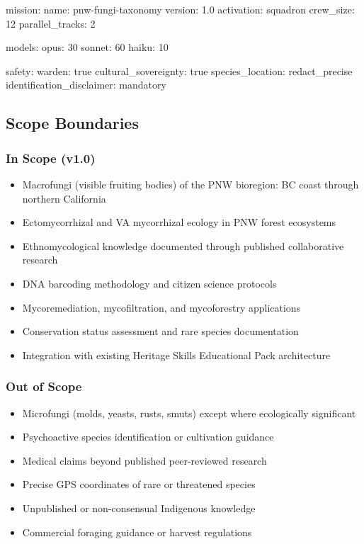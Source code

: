 \documentclass[11pt,letterpaper]{article}
\begin{document}
\begin{asciibox}
mission:
  name: pnw-fungi-taxonomy
  version: 1.0
  activation: squadron
  crew_size: 12
  parallel_tracks: 2

models:
  opus: 30%
  sonnet: 60%
  haiku: 10%

safety:
  warden: true
  cultural_sovereignty: true
  species_location: redact_precise
  identification_disclaimer: mandatory
\end{asciibox}

\subsection{Scope Boundaries}

\subsubsection{In Scope (v1.0)}

\begin{itemize}[leftmargin=2em]
\item Macrofungi (visible fruiting bodies) of the PNW bioregion: BC coast through northern California
\item Ectomycorrhizal and VA mycorrhizal ecology in PNW forest ecosystems
\item Ethnomycological knowledge documented through published collaborative research
\item DNA barcoding methodology and citizen science protocols
\item Mycoremediation, mycofiltration, and mycoforestry applications
\item Conservation status assessment and rare species documentation
\item Integration with existing Heritage Skills Educational Pack architecture
\end{itemize}

\subsubsection{Out of Scope}

\begin{itemize}[leftmargin=2em]
\item Microfungi (molds, yeasts, rusts, smuts) except where ecologically significant
\item Psychoactive species identification or cultivation guidance
\item Medical claims beyond published peer-reviewed research
\item Precise GPS coordinates of rare or threatened species
\item Unpublished or non-consensual Indigenous knowledge
\item Commercial foraging guidance or harvest regulations
\end{itemize}
\end{document}
